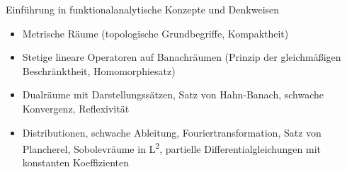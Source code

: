 \begin{module}
\begin{learningoutcomes}
Einführung in funktionalanalytische Konzepte und Denkweisen


\end{learningoutcomes}

\begin{content}
\begin{itemize}\item Metrische Räume (topologische Grundbegriffe, Kompaktheit)  \item Stetige lineare Operatoren auf Banachräumen (Prinzip der gleichmäßigen Beschränktheit, Homomorphiesatz)  \item Dualräume mit Darstellungssätzen, Satz von Hahn-Banach, schwache Konvergenz, Reflexivität  \item Distributionen, schwache Ableitung, Fouriertransformation, Satz von Plancherel, Sobolevräume in L\textsuperscript{2}, partielle Differentialgleichungen mit konstanten Koeffizienten  \end{itemize}
\end{content}



\end{module}

